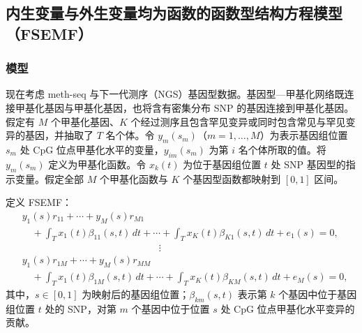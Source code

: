 \subsection{内生变量与外生变量均为函数的函数型结构方程模型（FSEMF）}
\subsubsection{模型}

现在考虑 meth-seq 与下一代测序（NGS）基因型数据。基因型—甲基化网络既连接甲基化基因与甲基化基因，也将含有密集分布 SNP 的基因连接到甲基化基因。假定有 $M$ 个甲基化基因、$K$ 个经过测序且包含罕见变异或同时包含常见与罕见变异的基因，并抽取了 $T$ 名个体。令 $y_m(s_m)$（$m=1,\ldots,M$）为表示基因组位置 $s_m$ 处 CpG 位点甲基化水平的变量，$y_{im}(s_m)$ 为第 $i$ 名个体所取的值。将 $y_m(s_m)$ 定义为甲基化函数。令 $x_k(t)$ 为位于基因组位置 $t$ 处 SNP 基因型的指示变量。假定全部 $M$ 个甲基化函数与 $K$ 个基因型函数都映射到 $[0,1]$ 区间。

定义 FSEMF：
\begin{equation}
\begin{aligned}
&y_1(s)r_{11}+\cdots+y_M(s)r_{M1}\\
&\quad+\int_Tx_1(t)\beta_{11}(s,t)\,dt+\cdots
+\int_Tx_K(t)\beta_{K1}(s,t)\,dt+e_1(s)=0,\\
&\hspace{14em}\vdots\\
&y_1(s)r_{1M}+\cdots+y_M(s)r_{MM}\\
&\quad+\int_Tx_1(t)\beta_{1M}(s,t)\,dt+\cdots
+\int_Tx_K(t)\beta_{KM}(s,t)\,dt+e_M(s)=0,
\end{aligned}
\tag{5.110}
\end{equation}
其中，$s\in[0,1]$ 为映射后的基因组位置；$\beta_{km}(s,t)$ 表示第 $k$ 个基因中位于基因组位置 $t$ 处的 SNP，对第 $m$ 个基因中位于位置 $s$ 处 CpG 位点甲基化水平变异的贡献。

